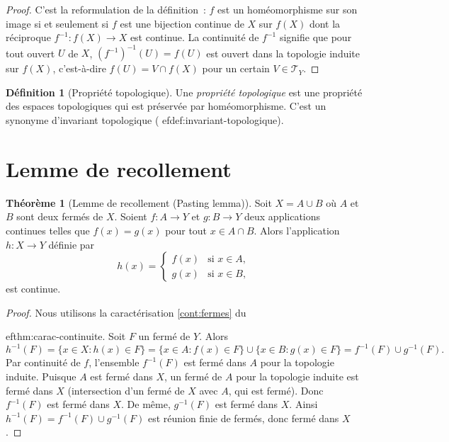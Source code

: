 \documentclass[12pt,a4paper,openany]{book}
\theoremstyle{definition}
\newtheorem{definition}{Définition}[chapter]
\theoremstyle{cours}
\newtheorem{theoreme}{Théorème}[chapter]
\theoremstyle{coursnormal}
\newcommand{\T}{\mathcal{T}}
\begin{document}
\begin{proof}
  C'est la reformulation de la définition~: $f$ est un homéomorphisme sur
  son image si et seulement si $f$ est une bijection continue de $X$ sur
  $f(X)$ dont la réciproque $f^{-1}\colon f(X)\to X$ est continue. La
  continuité de $f^{-1}$ signifie que pour tout ouvert $U$ de $X$,
  $(f^{-1})^{-1}(U)=f(U)$ est ouvert dans la topologie induite sur $f(X)$,
  c'est-à-dire $f(U)=V\cap f(X)$ pour un certain $V\in\T_Y$.
\end{proof}

\begin{definition}[Propriété topologique]\label{def:propriete-topologique}
  Une \emph{propriété topologique} est une
  propriété des espaces topologiques qui est préservée par homéomorphisme.
  C'est un synonyme d'invariant topologique (
ef{def:invariant-topologique}).
\end{definition}

\section{Lemme de recollement}\label{sec:lemme-recollement}

\begin{theoreme}[Lemme de recollement (Pasting lemma)]\label{thm:pasting-lemma}
  Soit $X = A\cup B$ où $A$ et $B$ sont deux fermés de $X$. Soient $f\colon A\to Y$ et $g\colon B\to Y$ deux
  applications continues telles que $f(x)=g(x)$ pour tout $x\in A\cap B$.
  Alors l'application $h\colon X\to Y$ définie par
  \[
    h(x) = \begin{cases}
      f(x) & \text{si } x\in A, \\
      g(x) & \text{si } x\in B,
    \end{cases}
  \]
  est continue.
\end{theoreme}

\begin{proof}
  Nous utilisons la caractérisation \ref{cont:fermes} du
  
ef{thm:carac-continuite}. Soit $F$ un fermé de $Y$. Alors
  \[
    h^{-1}(F) = \{x\in X : h(x)\in F\}
    = \{x\in A : f(x)\in F\} \cup \{x\in B : g(x)\in F\}
    = f^{-1}(F) \cup g^{-1}(F).
  \]
  Par continuité de $f$, l'ensemble $f^{-1}(F)$ est fermé dans $A$ pour la
  topologie induite. Puisque $A$ est fermé dans $X$, un fermé de $A$ pour la
  topologie induite est fermé dans $X$ (intersection d'un fermé de $X$ avec
  $A$, qui est fermé). Donc $f^{-1}(F)$ est fermé dans $X$. De même,
  $g^{-1}(F)$ est fermé dans $X$. Ainsi $h^{-1}(F) = f^{-1}(F)\cup g^{-1}(F)$
  est réunion finie de fermés, donc fermé dans $X$.
\end{proof}
\end{document}
